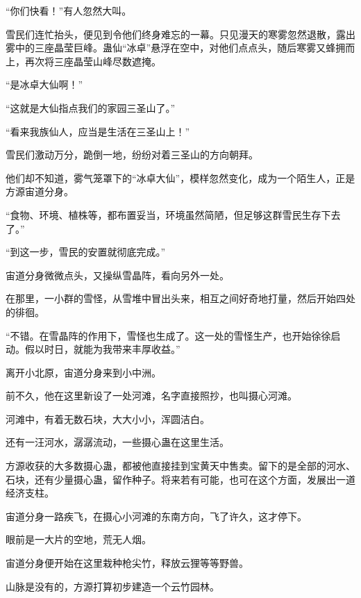 \begin{this_body}
“你们快看！”有人忽然大叫。

雪民们连忙抬头，便见到令他们终身难忘的一幕。只见漫天的寒雾忽然退散，露出雾中的三座晶莹巨峰。蛊仙“冰卓”悬浮在空中，对他们点点头，随后寒雾又蜂拥而上，再次将三座晶莹山峰尽数遮掩。

“是冰卓大仙啊！”

“这就是大仙指点我们的家园三圣山了。”

“看来我族仙人，应当是生活在三圣山上！”

雪民们激动万分，跪倒一地，纷纷对着三圣山的方向朝拜。

他们却不知道，雾气笼罩下的“冰卓大仙”，模样忽然变化，成为一个陌生人，正是方源宙道分身。

“食物、环境、植株等，都布置妥当，环境虽然简陋，但足够这群雪民生存下去了。”

“到这一步，雪民的安置就彻底完成。”

宙道分身微微点头，又操纵雪晶阵，看向另外一处。

在那里，一小群的雪怪，从雪堆中冒出头来，相互之间好奇地打量，然后开始四处的徘徊。

“不错。在雪晶阵的作用下，雪怪也生成了。这一处的雪怪生产，也开始徐徐启动。假以时日，就能为我带来丰厚收益。”

离开小北原，宙道分身来到小中洲。

前不久，他在这里新设了一处河滩，名字直接照抄，也叫摄心河滩。

河滩中，有着无数石块，大大小小，浑圆洁白。

还有一汪河水，潺潺流动，一些摄心蛊在这里生活。

方源收获的大多数摄心蛊，都被他直接挂到宝黄天中售卖。留下的是全部的河水、石块，还有少量摄心蛊，留作种子。将来若有可能，也可在这个方面，发展出一道经济支柱。

宙道分身一路疾飞，在摄心小河滩的东南方向，飞了许久，这才停下。

眼前是一大片的空地，荒无人烟。

宙道分身便开始在这里栽种枪尖竹，释放云狸等等野兽。

山脉是没有的，方源打算初步建造一个云竹园林。

\end{this_body}

